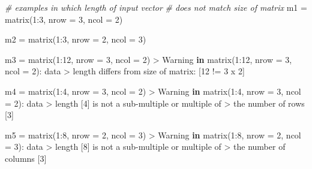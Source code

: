 \documentclass[
]{book}
\newenvironment{Shaded}{\begin{snugshade}}{\end{snugshade}}
\newcommand{\AttributeTok}[1]{\textcolor[rgb]{0.77,0.63,0.00}{#1}}
\newcommand{\CommentTok}[1]{\textcolor[rgb]{0.56,0.35,0.01}{\textit{#1}}}
\newcommand{\ControlFlowTok}[1]{\textcolor[rgb]{0.13,0.29,0.53}{\textbf{#1}}}
\newcommand{\DecValTok}[1]{\textcolor[rgb]{0.00,0.00,0.81}{#1}}
\newcommand{\FunctionTok}[1]{\textcolor[rgb]{0.00,0.00,0.00}{#1}}
\newcommand{\NormalTok}[1]{#1}
\newcommand{\OtherTok}[1]{\textcolor[rgb]{0.56,0.35,0.01}{#1}}
\newcommand{\SpecialCharTok}[1]{\textcolor[rgb]{0.00,0.00,0.00}{#1}}
\begin{document}
\begin{Shaded}
\begin{Highlighting}[]
\CommentTok{\# examples in which length of input vector}
\CommentTok{\# does not match size of matrix}
\NormalTok{m1 }\OtherTok{=} \FunctionTok{matrix}\NormalTok{(}\DecValTok{1}\SpecialCharTok{:}\DecValTok{3}\NormalTok{, }\AttributeTok{nrow =} \DecValTok{3}\NormalTok{, }\AttributeTok{ncol =} \DecValTok{2}\NormalTok{)}

\NormalTok{m2 }\OtherTok{=} \FunctionTok{matrix}\NormalTok{(}\DecValTok{1}\SpecialCharTok{:}\DecValTok{3}\NormalTok{, }\AttributeTok{nrow =} \DecValTok{2}\NormalTok{, }\AttributeTok{ncol =} \DecValTok{3}\NormalTok{)}

\NormalTok{m3 }\OtherTok{=} \FunctionTok{matrix}\NormalTok{(}\DecValTok{1}\SpecialCharTok{:}\DecValTok{12}\NormalTok{, }\AttributeTok{nrow =} \DecValTok{3}\NormalTok{, }\AttributeTok{ncol =} \DecValTok{2}\NormalTok{)}
\SpecialCharTok{\textgreater{}}\NormalTok{ Warning }\ControlFlowTok{in} \FunctionTok{matrix}\NormalTok{(}\DecValTok{1}\SpecialCharTok{:}\DecValTok{12}\NormalTok{, }\AttributeTok{nrow =} \DecValTok{3}\NormalTok{, }\AttributeTok{ncol =} \DecValTok{2}\NormalTok{)}\SpecialCharTok{:}\NormalTok{ data}
\SpecialCharTok{\textgreater{}}\NormalTok{ length differs from size of matrix}\SpecialCharTok{:}\NormalTok{ [}\DecValTok{12} \SpecialCharTok{!=} \DecValTok{3}\NormalTok{ x }\DecValTok{2}\NormalTok{]}

\NormalTok{m4 }\OtherTok{=} \FunctionTok{matrix}\NormalTok{(}\DecValTok{1}\SpecialCharTok{:}\DecValTok{4}\NormalTok{, }\AttributeTok{nrow =} \DecValTok{3}\NormalTok{, }\AttributeTok{ncol =} \DecValTok{2}\NormalTok{)}
\SpecialCharTok{\textgreater{}}\NormalTok{ Warning }\ControlFlowTok{in} \FunctionTok{matrix}\NormalTok{(}\DecValTok{1}\SpecialCharTok{:}\DecValTok{4}\NormalTok{, }\AttributeTok{nrow =} \DecValTok{3}\NormalTok{, }\AttributeTok{ncol =} \DecValTok{2}\NormalTok{)}\SpecialCharTok{:}\NormalTok{ data}
\SpecialCharTok{\textgreater{}}\NormalTok{ length [}\DecValTok{4}\NormalTok{] is not a sub}\SpecialCharTok{{-}}\NormalTok{multiple or multiple of}
\SpecialCharTok{\textgreater{}}\NormalTok{ the number of rows [}\DecValTok{3}\NormalTok{]}

\NormalTok{m5 }\OtherTok{=} \FunctionTok{matrix}\NormalTok{(}\DecValTok{1}\SpecialCharTok{:}\DecValTok{8}\NormalTok{, }\AttributeTok{nrow =} \DecValTok{2}\NormalTok{, }\AttributeTok{ncol =} \DecValTok{3}\NormalTok{)}
\SpecialCharTok{\textgreater{}}\NormalTok{ Warning }\ControlFlowTok{in} \FunctionTok{matrix}\NormalTok{(}\DecValTok{1}\SpecialCharTok{:}\DecValTok{8}\NormalTok{, }\AttributeTok{nrow =} \DecValTok{2}\NormalTok{, }\AttributeTok{ncol =} \DecValTok{3}\NormalTok{)}\SpecialCharTok{:}\NormalTok{ data}
\SpecialCharTok{\textgreater{}}\NormalTok{ length [}\DecValTok{8}\NormalTok{] is not a sub}\SpecialCharTok{{-}}\NormalTok{multiple or multiple of}
\SpecialCharTok{\textgreater{}}\NormalTok{ the number of columns [}\DecValTok{3}\NormalTok{]}
\end{Highlighting}
\end{Shaded}
\end{document}
